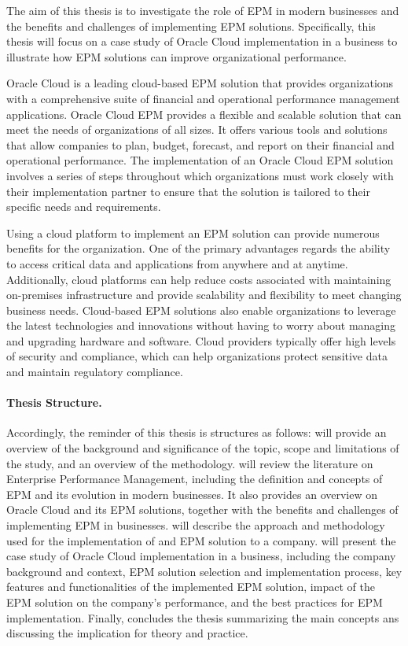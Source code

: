 \documentclass[12pt,a4paper,openright,twoside]{book}
\begin{document}
 The aim of this thesis is to investigate the role of EPM in modern businesses and the benefits and challenges of implementing EPM solutions. 
 Specifically, this thesis will focus on a case study of Oracle Cloud implementation in a business to illustrate how EPM solutions can improve organizational performance. 
 
 Oracle Cloud is a leading cloud-based EPM solution that provides organizations with a comprehensive suite of financial and operational performance management applications.
Oracle Cloud EPM provides a flexible and scalable solution that can meet the needs of organizations of all sizes.
%
It offers various tools and solutions that allow companies to plan, budget, forecast, and report on their financial and operational performance.
%
The implementation of an Oracle Cloud EPM solution involves a series of steps throughout which organizations must work closely with their implementation partner to ensure that the solution is tailored to their specific needs and requirements.

Using a cloud platform to implement an EPM solution can provide numerous benefits for the organization. 
%
One of the primary advantages regards the ability to access critical data and applications from anywhere and at anytime.
%
Additionally, cloud platforms can help reduce costs associated with maintaining on-premises infrastructure and provide scalability and flexibility to meet changing business needs. 
%
Cloud-based EPM solutions also enable organizations to leverage the latest technologies and innovations without having to worry about managing and upgrading hardware and software. 
%
Cloud providers typically offer high levels of security and compliance, which can help organizations protect sensitive data and maintain regulatory compliance. 

%
\paragraph{Thesis Structure.}
%

Accordingly, the reminder of this thesis is structures as follows:
%
 will provide an overview of the background and significance of the topic, scope and limitations of the study, and an overview of the methodology.
%
 will review the literature on Enterprise Performance Management, including the definition and concepts of EPM and its evolution in modern businesses. 
%
It also provides an overview on Oracle Cloud and its EPM solutions, together with the benefits and challenges of implementing EPM in businesses. 
%
 will describe the approach and methodology used for the implementation of and EPM solution to a company.
%
 will present the case study of Oracle Cloud implementation in a business, including the company background and context, EPM solution selection and implementation process, key features and functionalities of the implemented EPM solution, impact of the EPM solution on the company's performance, and the best practices for EPM implementation. 
%
Finally,  concludes the thesis summarizing the main concepts ans discussing the implication for theory and practice.
\end{document}

